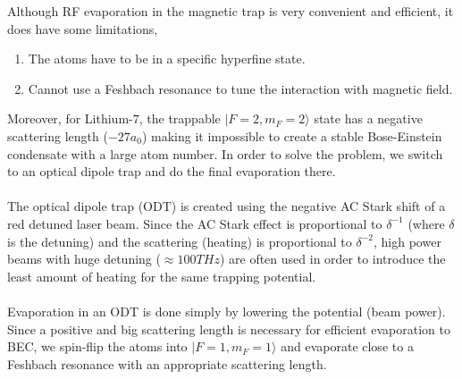 Although RF evaporation in the magnetic trap is very convenient and efficient, it does have some limitations,
\begin{enumerate}
\item
  The atoms have to be in a specific hyperfine state.
\item
  Cannot use a Feshbach resonance to tune the interaction with magnetic field.
\end{enumerate}
Moreover, for Lithium-$7$, the trappable $|F=2, m_F=2\rangle$ state has a negative scattering length ($-27a_0$) making it impossible to create a stable Bose-Einstein condensate with a large atom number. In order to solve the problem, we switch to an optical dipole trap and do the final evaporation there.\\
\\
The optical dipole trap (ODT) is created using the negative AC Stark shift of a red detuned laser beam. Since the AC Stark effect is proportional to $\delta^{-1}$ (where $\delta$ is the detuning) and the scattering (heating) is proportional to $\delta^{-2}$, high power beams with huge detuning ($\approx100THz$) are often used in order to introduce the least amount of heating for the same trapping potential.\\
\\
Evaporation in an ODT is done simply by lowering the potential (beam power). Since a positive and big scattering length is necessary for efficient evaporation to BEC, we spin-flip the atoms into $|F=1, m_F=1\rangle$ and evaporate close to a Feshbach resonance with an appropriate scattering length.
